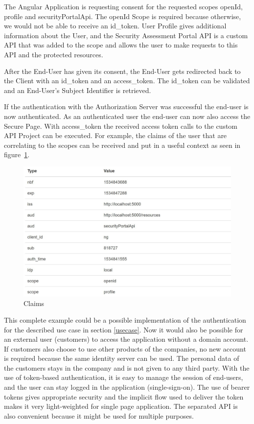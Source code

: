 The Angular Application is requesting consent for the requested scopes openId, profile and securityPortalApi. The openId Scope is required because otherwise, we would not be able to receive an id\_token. User Profile gives additional information about the User, and the  Security Assessment Portal API is a custom API that was added to the scope and allows the user to make requests to this API and the protected resources. 


After the End-User has given its consent, the End-User gets redirected back to the Client with an id\_token and an access\_token. The id\_token can be validated and an End-User’s Subject Identifier is retrieved.

If the authentication with the Authorization Server was successful the end-user is now authenticated. As an authenticated user the end-user can now also access the Secure Page. With access\_token the received access token calls to the custom API Project can be executed. For example, the claims of the user that are correlating to the scopes can be received and put in a useful context as seen in figure~\ref{fig:claims}.


\begin{figure}[h]
	\centering
	\includegraphics[width=0.7\linewidth]{images/claims}
	\caption{Claims}
	\label{fig:claims}
\end{figure}
 
 \pagebreak[4]

This complete example could be a possible implementation of the authentication for the described use case in section \ref{usecase}. Now it would also be possible for an external user (customers) to access the application without a domain account. If customers also choose to use other products of the companies, no new account is required because the same identity server can be used. The personal data of the customers stays in the company and is not given to any third party. With the use of token-based authentication, it is easy to manage the session of end-users, and the user can stay logged in the application (single-sign-on). The use of bearer tokens gives appropriate security and the implicit flow used to deliver the token makes it very light-weighted for single page application. The separated API is also convenient because it might be used for multiple purposes.

\chapterend
